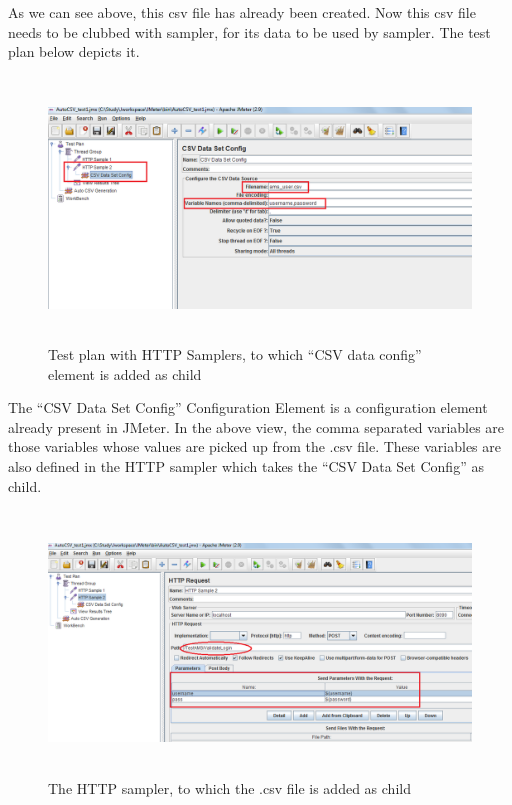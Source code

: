 \documentclass[12pt]{book}
\begin{document}
  As we can see above, this csv file has already been created. Now this csv file needs to be
  clubbed with sampler, for its data to be used by sampler. The test plan below depicts it.
  
  \begin{figure}[H]
   \centering
   \includegraphics[width=15cm, height=7cm]{images/autocsvgeneration_84}
   \caption{Test plan with HTTP Samplers, to which “CSV data config” element is added as child\label{fig:fig24_JMeter}}
  \end{figure}    
  
  The ``CSV Data Set Config'' Configuration Element is a configuration element already present in
  JMeter. In the above view, the comma separated variables are those variables whose values are
  picked up from the .csv file. These variables are also defined in the HTTP sampler which takes
  the ``CSV Data Set Config'' as child.
  
  \begin{figure}[H]
   \centering
   \includegraphics[width=15cm, height=7cm]{images/autocsvgeneration_85}
   \caption{The HTTP sampler, to which the .csv file is added as child\label{fig:fig25_JMeter}}
  \end{figure}    
\end{document}

